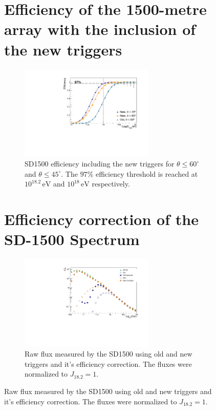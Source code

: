 \documentclass[12pt,a4paper]{article}
\newcommand{\eV}{\, \mathrm{eV}}
\begin{document}
\begin{figure}[]
\section{Efficiency of the 1500-metre array with the inclusion of the new triggers}
\label{sec:new}

\begin{figure}[h]
    \begin{center}
        \includegraphics[width=0.7\textwidth]{plots/NewCut.pdf}
        \caption{SD1500 efficiency including the new triggers for $\theta\leq60^\circ$ and $\theta\leq45^\circ$. The $97\%$ efficiency threshold is reached at $10^{18.2}\eV$ and $10^{18}\eV$ respectively.
        \label{fig:NewCut}}
    \end{center}
\end{figure}


\section{Efficiency correction of the SD-1500 Spectrum}
\label{sec:spectrum}


\begin{figure}[hb]
    \begin{center}
        \includegraphics[width=0.7\textwidth]{plots/spectrum.pdf}
        \caption{Raw flux measured by the SD1500 using old and new triggers and it's efficiency correction. The fluxes were normalized to $J_{18.2}=1$.
        \label{fig:flux}}
    \end{center}
\end{figure}


\end{figure}
\end{document}

